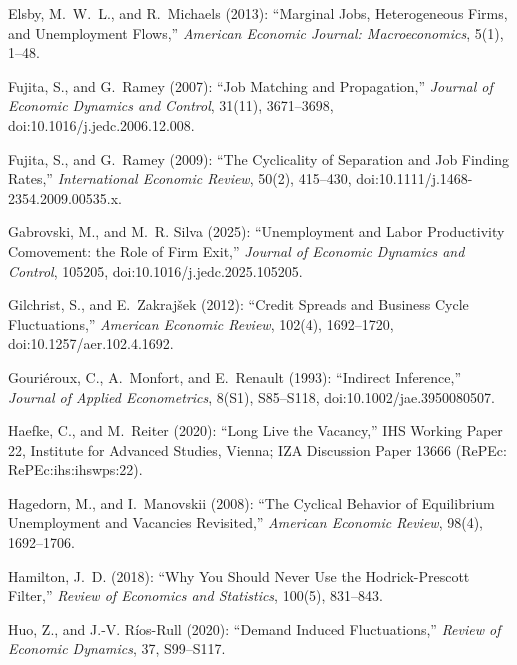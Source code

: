 \documentclass[authoryear, review, 12pt]{elsarticle}
\begin{document}
\begin{thebibliography}{}
Elsby, M.~W.~L., and R.~Michaels (2013): ``Marginal Jobs, Heterogeneous Firms, and Unemployment Flows,'' \emph{American Economic Journal: Macroeconomics}, 5(1), 1--48.

Fujita, S., and G.~Ramey (2007): ``Job Matching and Propagation,'' \emph{Journal of Economic Dynamics and Control}, 31(11), 3671--3698, doi:10.1016/j.jedc.2006.12.008.

Fujita, S., and G.~Ramey (2009): ``The Cyclicality of Separation and Job Finding Rates,'' \emph{International Economic Review}, 50(2), 415--430, doi:10.1111/j.1468-2354.2009.00535.x.

Gabrovski, M., and M.~R. Silva (2025): ``Unemployment and Labor Productivity Comovement: the Role of Firm Exit,'' \emph{Journal of Economic Dynamics and Control}, 105205, doi:10.1016/j.jedc.2025.105205.

Gilchrist, S., and E.~Zakraj{\v s}ek (2012): ``Credit Spreads and Business Cycle Fluctuations,'' \emph{American Economic Review}, 102(4), 1692--1720, doi:10.1257/aer.102.4.1692.

Gouri{\'e}roux, C., A.~Monfort, and E.~Renault (1993): ``Indirect Inference,'' \emph{Journal of Applied Econometrics}, 8(S1), S85--S118, doi:10.1002/jae.3950080507.

Haefke, C., and M.~Reiter (2020): ``Long Live the Vacancy,'' IHS Working Paper 22, Institute for Advanced Studies, Vienna; IZA Discussion Paper 13666 (RePEc: RePEc:ihs:ihswps:22).

Hagedorn, M., and I.~Manovskii (2008): ``The Cyclical Behavior of Equilibrium Unemployment and Vacancies Revisited,'' \emph{American Economic Review}, 98(4), 1692--1706.

Hamilton, J.~D. (2018): ``Why You Should Never Use the Hodrick-Prescott Filter,'' \emph{Review of Economics and Statistics}, 100(5), 831--843.

Huo, Z., and J.-V. R{\'i}os-Rull (2020): ``Demand Induced Fluctuations,'' \emph{Review of Economic Dynamics}, 37, S99--S117.


\end{thebibliography}
\end{document}
